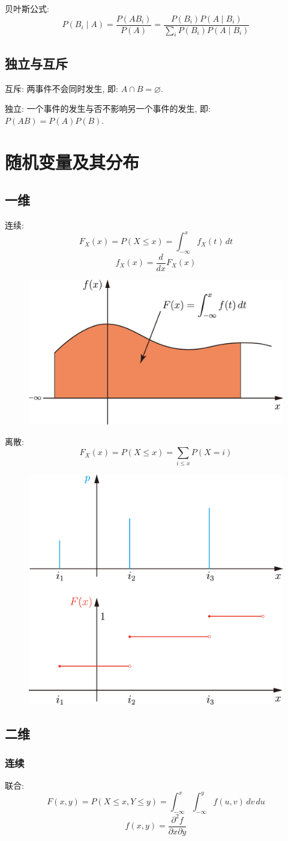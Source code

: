 \documentclass[UTF8]{ctexart}
\begin{document}
贝叶斯公式:
\[ P(B_i \mid A) = \dfrac{P(AB_i)}{P(A)} = \dfrac{P(B_i) P( A \mid B_i)}{\sum\limits_i P(B_i) P(A \mid B_i)} \]

\subsection{独立与互斥}
互斥: 两事件不会同时发生, 即: $ A \cap B = \varnothing $.

独立: 一个事件的发生与否不影响另一个事件的发生, 即: $ P(AB) = P(A) P(B) $.

\newpage
\section{随机变量及其分布}
\subsection{一维}
连续:
\[ F_X(x) = P(X \leqslant x) = \int_{-\infty}^{x} f_X(t) \,dt \]
\[ f_X(x) = \dfrac{d}{dx}F_X(x) \]
\begin{figure}[H]
     \centering
     \includegraphics[width = 0.4\linewidth]{PDF&CDF.png}
\end{figure}

离散:
\[ F_X(x) = P(X \leqslant x) = \sum_{i \leqslant x} P(X = i) \]
\begin{figure}[H]
     \centering
     \includegraphics[width = 0.4\linewidth]{discrete_PDF&CDF.png}
\end{figure}


\subsection{二维}
\subsubsection{连续}
联合:
\[ F(x, y) = P(X \leqslant x, Y \leqslant y) = \int_{-\infty}^{x} \int_{-\infty}^{y} f(u, v) \,dv \,du \]
\[ f(x, y) = \dfrac{\partial^2 f}{\partial x \partial y} \]
\end{document}
